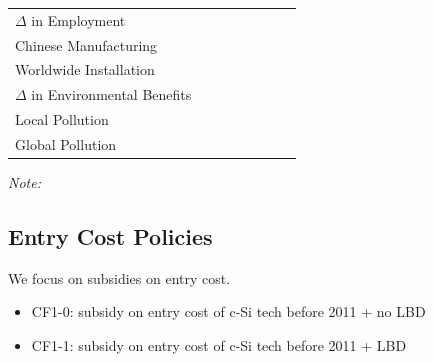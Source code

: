 \documentclass[12pt, letter]{article}
\begin{document}
\begin{table}[tbh]
\begin{threeparttable}
\begin{tabularx}{1.0\textwidth}{Xlllllll}
$\Delta$ in Employment &  &  &&  &  \\
\quad\quad Chinese Manufacturing & &   &&  &  \\
\quad\quad Worldwide Installation & &   &&  &  \\
$\Delta$ in Environmental Benefits &  &  &&  &  \\
\quad\quad Local Pollution & &  &&  &  \\
\quad\quad Global Pollution & &  &&  &  \\
\bottomrule
\end{tabularx}
\begin{tablenotes}
  \item \textit{Note:} 
\end{tablenotes}
\end{threeparttable}
\end{table}

\subsection{Entry Cost Policies}
\label{subsec:cf_entry}
We focus on subsidies on entry cost.
\begin{itemize}
    \item CF1-0: subsidy on entry cost of c-Si tech before 2011 + no LBD
    \item CF1-1: subsidy on entry cost of c-Si tech before 2011 + LBD
\end{itemize} 
\end{document}
